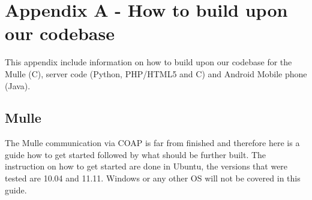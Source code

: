 

\section{Appendix A - How to build upon our codebase}
This appendix include information on how to build upon our codebase for the Mulle (C), server code (Python, PHP/HTML5 and C) and Android Mobile phone (Java).
\subsection{Mulle}
The Mulle communication via COAP is far from finished and therefore here is a guide how to get started followed by what should be further built. The instruction on how to get started are done in Ubuntu, the versions that were tested are 10.04 and 11.11. Windows or any other OS will not be covered in this guide.

